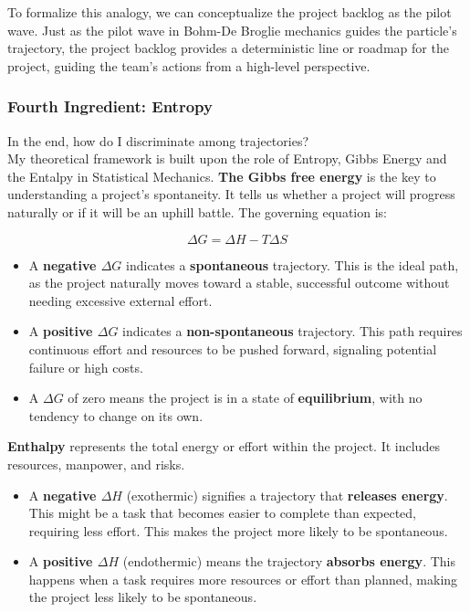 \documentclass{article}
\begin{document}
To formalize this analogy, we can conceptualize the project backlog as the pilot wave. Just as the pilot wave in Bohm-De Broglie mechanics guides the particle's trajectory, the project backlog provides a deterministic line or roadmap for the project, guiding the team's actions from a high-level perspective.

\newpage
\subsubsection*{Fourth Ingredient: Entropy}
In the end, how do I discriminate among trajectories?\\
My theoretical framework is built upon the role of Entropy, Gibbs Energy and the Entalpy in Statistical Mechanics.
\textbf{The Gibbs free energy} is the key to understanding a project's spontaneity. It tells us whether a project will progress naturally or if it will be an uphill battle. The governing equation is:

$$ \Delta G = \Delta H - T\Delta S $$

\begin{itemize}
    \item A \textbf{negative $\Delta G$} indicates a \textbf{spontaneous} trajectory. This is the ideal path, as the project naturally moves toward a stable, successful outcome without needing excessive external effort.
    \item A \textbf{positive $\Delta G$} indicates a \textbf{non-spontaneous} trajectory. This path requires continuous effort and resources to be pushed forward, signaling potential failure or high costs.
    \item A $\Delta G$ of zero means the project is in a state of \textbf{equilibrium}, with no tendency to change on its own.
\end{itemize}


\textbf{Enthalpy} represents the total energy or effort within the project. It includes resources, manpower, and risks.

\begin{itemize}
    \item A \textbf{negative $\Delta H$} (exothermic) signifies a trajectory that \textbf{releases energy}. This might be a task that becomes easier to complete than expected, requiring less effort. This makes the project more likely to be spontaneous.
    \item A \textbf{positive $\Delta H$} (endothermic) means the trajectory \textbf{absorbs energy}. This happens when a task requires more resources or effort than planned, making the project less likely to be spontaneous.
\end{itemize}
\end{document}
